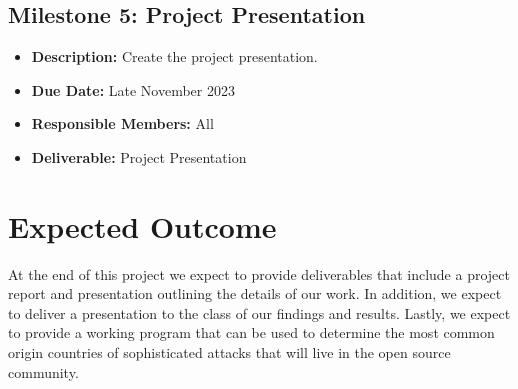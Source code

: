 \documentclass[letterpaper, 10 pt, conference]{ieeeconf}  %
\begin{document}
    \subsection*{Milestone 5: Project Presentation}
    \begin{itemize}
        \item \textbf{Description:} Create the project presentation.
        \item \textbf{Due Date:} Late November 2023
        \item \textbf{Responsible Members:} All
        \item \textbf{Deliverable:} Project Presentation
    \end{itemize}


\section{Expected Outcome}

At the end of this project we expect to provide deliverables that include a project report and presentation outlining the details of our work. 
In addition, we expect to deliver a presentation to the class of our findings and results. 
Lastly, we expect to provide a working program that can be used to determine the most common origin countries of sophisticated attacks that will live in the open source community. 
\end{document}
